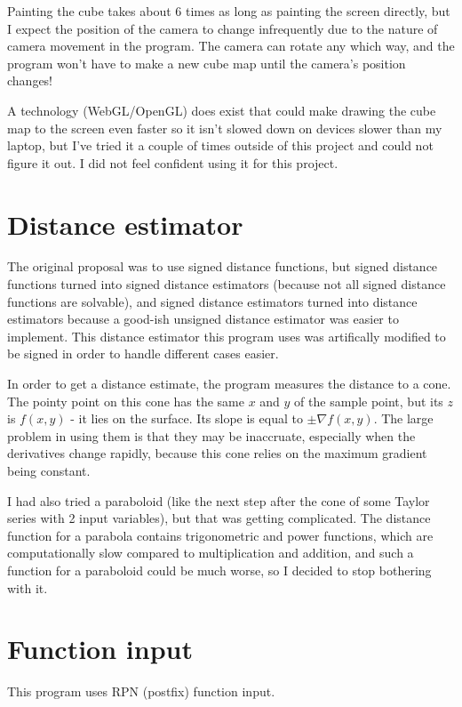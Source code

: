 Painting the cube takes about 6 times as long as painting the screen directly, but I expect the position of the camera to change infrequently due to the nature of camera movement in the program.  The camera can rotate any which way, and the program won't have to make a new cube map until the camera's position changes!

A technology (WebGL/OpenGL) does exist that could make drawing the cube map to the screen even faster so it isn't slowed down on devices slower than my laptop, but I've tried it a couple of times outside of this project and could not figure it out.  I did not feel confident using it for this project.

\section*{Distance estimator}

The original proposal was to use signed distance functions, but signed distance functions turned into signed distance estimators (because not all signed distance functions are solvable), and signed distance estimators turned into distance estimators because a good-ish unsigned distance estimator was easier to implement.  This distance estimator this program uses was artifically modified to be signed in order to handle different cases easier.

In order to get a distance estimate, the program measures the distance to a cone.  The pointy point on this cone has the same $x$ and $y$ of the sample point, but its $z$ is $f(x,y)$ - it lies on the surface.  Its slope is equal to $\pm\nabla f(x,y)$.  The large problem in using them is that they may be inaccruate, especially when the derivatives change rapidly, because this cone relies on the maximum gradient being constant.

I had also tried a paraboloid (like the next step after the cone of some Taylor series with 2 input variables), but that was getting complicated.  The distance function for a parabola contains trigonometric and power functions, which are computationally slow compared to multiplication and addition, and such a function for a paraboloid could be much worse, so I decided to stop bothering with it.

\section*{Function input}

This program uses RPN (postfix) function input.

